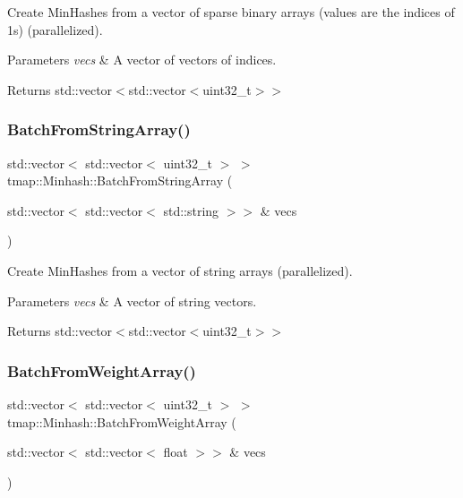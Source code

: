 Create Min\+Hashes from a vector of sparse binary arrays (values are the indices of 1s) (parallelized). 


\begin{DoxyParams}{Parameters}
{\em vecs} & A vector of vectors of indices. \\
\hline
\end{DoxyParams}
\begin{DoxyReturn}{Returns}
std\+::vector$<$std\+::vector$<$uint32\+\_\+t$>$$>$ 
\end{DoxyReturn}
\mbox{\label{classtmap_1_1Minhash_a9382e443b9f622c4564449373051d006}} 
\subsubsection{\texorpdfstring{Batch\+From\+String\+Array()}{BatchFromStringArray()}}
{\footnotesize\ttfamily std\+::vector$<$ std\+::vector$<$ uint32\+\_\+t $>$ $>$ tmap\+::\+Minhash\+::\+Batch\+From\+String\+Array (\begin{DoxyParamCaption}\item[{std\+::vector$<$ std\+::vector$<$ std\+::string $>$$>$ \&}]{vecs }\end{DoxyParamCaption})}



Create Min\+Hashes from a vector of string arrays (parallelized). 


\begin{DoxyParams}{Parameters}
{\em vecs} & A vector of string vectors. \\
\hline
\end{DoxyParams}
\begin{DoxyReturn}{Returns}
std\+::vector$<$std\+::vector$<$uint32\+\_\+t$>$$>$ 
\end{DoxyReturn}
\mbox{\label{classtmap_1_1Minhash_a20feda993a498b2d92b8e81ca71f73a9}} 
\subsubsection{\texorpdfstring{Batch\+From\+Weight\+Array()}{BatchFromWeightArray()}}
{\footnotesize\ttfamily std\+::vector$<$ std\+::vector$<$ uint32\+\_\+t $>$ $>$ tmap\+::\+Minhash\+::\+Batch\+From\+Weight\+Array (\begin{DoxyParamCaption}\item[{std\+::vector$<$ std\+::vector$<$ float $>$$>$ \&}]{vecs }\end{DoxyParamCaption})}



